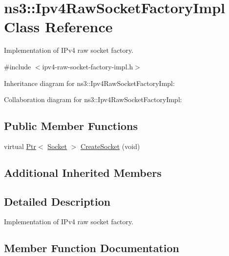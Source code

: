 \hypertarget{classns3_1_1Ipv4RawSocketFactoryImpl}{}\section{ns3\+:\+:Ipv4\+Raw\+Socket\+Factory\+Impl Class Reference}
\label{classns3_1_1Ipv4RawSocketFactoryImpl}


Implementation of I\+Pv4 raw socket factory.  




{\ttfamily \#include $<$ipv4-\/raw-\/socket-\/factory-\/impl.\+h$>$}



Inheritance diagram for ns3\+:\+:Ipv4\+Raw\+Socket\+Factory\+Impl\+:


Collaboration diagram for ns3\+:\+:Ipv4\+Raw\+Socket\+Factory\+Impl\+:
\subsection*{Public Member Functions}
\begin{DoxyCompactItemize}
\item 
virtual \hyperlink{classns3_1_1Ptr}{Ptr}$<$ \hyperlink{classns3_1_1Socket}{Socket} $>$ \hyperlink{classns3_1_1Ipv4RawSocketFactoryImpl_a0efcfba2ddb37c856eec5078741fa117}{Create\+Socket} (void)
\end{DoxyCompactItemize}
\subsection*{Additional Inherited Members}


\subsection{Detailed Description}
Implementation of I\+Pv4 raw socket factory. 

\subsection{Member Function Documentation}
